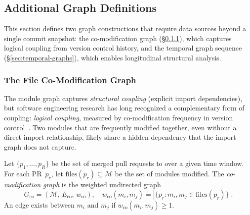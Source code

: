 \subsection{Additional Graph Definitions}
\label{sec:future-graphs}

This section defines two graph constructions that require data sources beyond a single commit snapshot: the co-modification graph (\S\ref{sec:co-edit-graph}), which captures logical coupling from version control history, and the temporal graph sequence (\S\ref{sec:temporal-graphs}), which enables longitudinal structural analysis.

\subsubsection{The File Co-Modification Graph}
\label{sec:co-edit-graph}

The module graph captures \emph{structural coupling} (explicit import dependencies), but software engineering research has long recognized a complementary form of coupling: \emph{logical coupling}, measured by co-modification frequency in version control~\cite{decan2019}. Two modules that are frequently modified together, even without a direct import relationship, likely share a hidden dependency that the import graph does not capture.

\begin{definition}\label{def:co-edit-graph}
Let $\{p_1, \ldots, p_R\}$ be the set of merged pull requests to  over a given time window. For each PR~$p_r$, let $\mathrm{files}(p_r) \subseteq \mathcal{M}$ be the set of modules modified. The \emph{co-modification graph} is the weighted undirected graph
\[
  G_{\mathrm{co}} = (\mathcal{M},\, E_{\mathrm{co}},\, w_{\mathrm{co}}), \quad w_{\mathrm{co}}(m_i, m_j) = |\{p_r : m_i, m_j \in \mathrm{files}(p_r)\}|.
\]
An edge exists between $m_i$ and $m_j$ if $w_{\mathrm{co}}(m_i, m_j) \ge 1$.
\end{definition}

